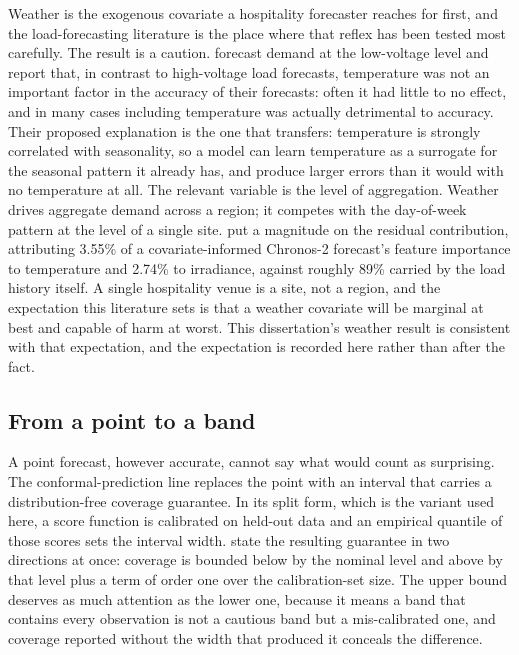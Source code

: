 Weather is the exogenous covariate a hospitality forecaster reaches for first,
and the load-forecasting literature is the place where that reflex has been
tested most carefully. The result is a caution.
\citet{haben_short_2019} forecast demand at the low-voltage level and report
that, in contrast to high-voltage load forecasts, temperature was not an
important factor in the accuracy of their forecasts: often it had little to no
effect, and in many cases including temperature was actually detrimental to
accuracy. Their proposed explanation is the one that transfers: temperature is
strongly correlated with seasonality, so a model can learn temperature as a
surrogate for the seasonal pattern it already has, and produce larger errors
than it would with no temperature at all. The relevant variable is the level of
aggregation. Weather drives aggregate demand across a region; it competes with
the day-of-week pattern at the level of a single site.
\citet{hertel_explainable_2026} put a magnitude on the residual contribution,
attributing 3.55\% of a covariate-informed Chronos-2 forecast's feature
importance to temperature and 2.74\% to irradiance, against roughly 89\%
carried by the load history itself. A single hospitality venue is a site, not a
region, and the expectation this literature sets is that a weather covariate
will be marginal at best and capable of harm at worst. This dissertation's
weather result is consistent with that expectation, and the expectation is
recorded here rather than after the fact.

\subsection*{From a point to a band}

A point forecast, however accurate, cannot say what would count as surprising.
The conformal-prediction line replaces the point with an interval that carries
a distribution-free coverage guarantee. In its split form, which is the
variant used here, a score function is calibrated on held-out data and an
empirical quantile of those scores sets the interval width.
\citet{angelopoulos_conformal_2023} state the resulting guarantee in two
directions at once: coverage is bounded below by the nominal level and above
by that level plus a term of order one over the calibration-set size. The
upper bound deserves as much attention as the lower one, because it means a
band that contains every observation is not a cautious band but a
mis-calibrated one, and coverage reported without the width that produced it
conceals the difference.

